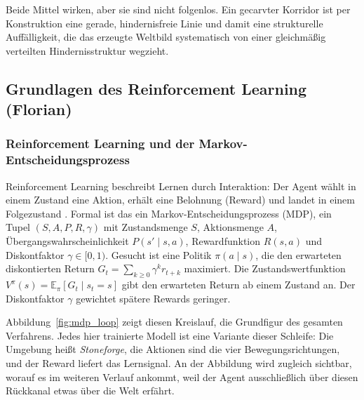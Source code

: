 \documentclass[11pt,a4paper]{article}
\begin{document}
Beide Mittel wirken, aber sie sind nicht folgenlos. Ein gecarvter Korridor ist
per Konstruktion eine gerade, hindernisfreie Linie und damit eine strukturelle
Auffälligkeit, die das erzeugte Weltbild systematisch von einer gleichmäßig
verteilten Hindernisstruktur wegzieht.

\subsection{Grundlagen des Reinforcement Learning (Florian)}
\label{sec:g_rl}

\subsubsection{Reinforcement Learning und der Markov-Entscheidungsprozess}
\label{sec:mdp}

Reinforcement Learning beschreibt Lernen durch Interaktion: Der Agent wählt in
einem Zustand eine Aktion, erhält eine Belohnung (Reward) und landet in einem
Folgezustand \cite{sutton2018rl}. Formal ist das ein
Markov-Entscheidungsprozess (MDP), ein Tupel $(S, A, P, R, \gamma)$ mit
Zustandsmenge $S$, Aktionsmenge $A$, Übergangswahrscheinlichkeit
$P(s'\mid s,a)$, Rewardfunktion $R(s,a)$ und Diskontfaktor $\gamma \in [0,1)$.
Gesucht ist eine Politik $\pi(a\mid s)$, die den erwarteten diskontierten Return
$G_t = \sum_{k\geq 0} \gamma^k r_{t+k}$ maximiert. Die Zustandswertfunktion
$V^\pi(s) = \mathbb{E}_\pi[G_t \mid s_t=s]$ gibt den erwarteten Return ab einem
Zustand an. Der Diskontfaktor $\gamma$ gewichtet spätere Rewards geringer.

Abbildung~\ref{fig:mdp_loop} zeigt diesen Kreislauf, die Grundfigur des
gesamten Verfahrens. Jedes hier trainierte Modell ist eine Variante dieser
Schleife: Die Umgebung heißt \emph{Stoneforge}, die Aktionen sind die vier
Bewegungsrichtungen, und der Reward liefert das Lernsignal. An der Abbildung wird zugleich sichtbar,
worauf es im weiteren Verlauf ankommt, weil der Agent ausschließlich über
diesen Rückkanal etwas über die Welt erfährt.
\end{document}
